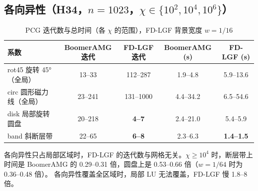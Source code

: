\documentclass[11pt,a4paper]{ctexart}
\begin{document}
\subsection{各向异性（H34，$n=1023$，$\chi\in\{10^2,10^4,10^6\}$）}
\begin{table}[H]\centering\small
\caption{PCG 迭代数与总时间（各 $\chi$ 的范围），FD-LGF 背景宽度 $w=1/16$}
\begin{tabular}{lcccc}
\toprule
系数 & BoomerAMG 迭代 & FD-LGF 迭代 & BoomerAMG (s) & FD-LGF (s) \\
\midrule
rot45 旋转 45°（全局） & 13--33 & 112--287 & 1.9--4.8 & 5.9--13.6 \\
circ 圆形磁力线（全局） & 23--241 & 131--1000 & 4.4--34.2 & 6.5--54.6 \\
disk 局部旋转圆盘 & 20--218 & \textbf{4--7} & 2.4--21.0 & 5.4--5.9 \\
band 斜断层带 & 22--65 & \textbf{6--8} & 2.3--6.3 & \textbf{1.4--1.5} \\
\bottomrule
\end{tabular}
\end{table}
各向异性只占局部区域时，FD-LGF 的迭代数与网格无关。$\chi\ge10^4$ 时，断层带上时间是 BoomerAMG 的 0.29--0.31 倍，圆盘上是 0.53--0.66 倍（$w=1/64$ 时为 0.36--0.48 倍）。
各向异性覆盖全区域时，局部 LU 无法覆盖，FD-LGF 慢 1.8--8 倍。
\end{document}
